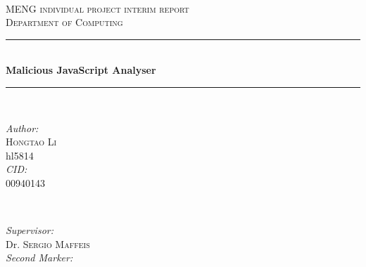 \documentclass[11pt]{article}
\begin{document}
\begin{titlepage}

\newcommand{\HRule}{\rule{\linewidth}{0.5mm}} %
\setlength{\topmargin}{0in}
\center %
 
 
 \begin{minipage}{0.4\textwidth}
\begin{flushleft} \large
\hspace*{-0.5cm}
\end{flushleft}
\end{minipage}
~


\textsc{\Large MENG individual project interim report}\\[0.5cm] %
\textsc{\large Department of Computing}\\[0.5cm] %


\HRule \\[0.4cm]
{ \huge \bfseries Malicious JavaScript Analyser}\\[0.4cm] %
\HRule \\[1cm]
 

\begin{minipage}{0.4\textwidth}
\begin{flushleft} \large
\emph{Author:}\\
 \textsc{Hongtao Li} \\ %
hl5814 \\ [0.5cm]
\emph{CID:}\\
00940143
\end{flushleft}
\end{minipage}
~
\begin{minipage}{0.5\textwidth}
\begin{flushright} \large
\emph{Supervisor:} \\
Dr. \textsc{Sergio Maffeis } \\[0.5cm] %
\emph{Second Marker:} \\
\textsc{} %
\end{flushright}
\end{minipage}\\[1cm]


\end{titlepage}
\end{document}
